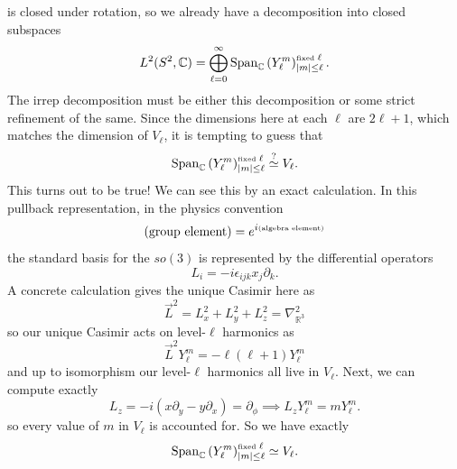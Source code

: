 \documentclass[11pt,letterpaper]{article}
\newcommand{\LP}{\left(}
\newcommand{\RP}{\right)}
\newcommand{\R}{\mathbb{R}}
\newcommand{\C}{\mathbb{C}}
\newcommand{\D}{\partial}
\begin{document}
is closed under rotation, so we already have a decomposition into closed subspaces \begin{equation}
L^2(S^2, \C) = \bigoplus_{\ell = 0}^\infty \mbox{Span}_\C \LP Y_\ell^m \RP_{|m| \leq \ell}^{\mbox{\tiny{fixed }} \ell}.
\end{equation}
The irrep decomposition must be either this decomposition or some strict refinement of the same. Since the dimensions here at each $\ell$ are $2 \ell + 1$, which matches the dimension of $V_\ell$, it is tempting to guess that \begin{equation}
\mbox{Span}_\C \LP Y_\ell^m \RP_{|m| \leq \ell}^{\mbox{\tiny{fixed }} \ell} \stackrel{?}{\simeq} V_\ell.
\end{equation}
This turns out to be true! We can see this by an exact calculation. In this pullback representation, in the physics convention \begin{equation}
\mbox{(group element)} = e^{i \mbox{\tiny{(algebra element)}}}
\end{equation}
the standard basis for the $so(3)$ is represented by the differential operators \begin{equation}
L_i = - i \epsilon_{ijk} x_j \D_k.
\end{equation}
A concrete calculation gives the unique Casimir here as \begin{equation}
\vec{L}^2 = L_x^2 + L_y^2 + L_z^2 = \nabla^2_{\R^3}
\end{equation}
so our unique Casimir acts on level-$\ell$ harmonics as \begin{equation}
\vec{L}^2 Y_\ell^m = - \ell(\ell + 1) Y_\ell^m
\end{equation}
and up to isomorphism our level-$\ell$ harmonics all live in $V_\ell$. Next, we can compute exactly \begin{equation}
L_z = - i (x \D_y - y \D_x) = \D_\phi \implies L_z Y_\ell ^m = m Y_\ell^m.
\end{equation}
so every value of $m$ in $V_\ell$ is accounted for. So we have exactly \begin{equation}
\mbox{Span}_\C \LP Y_\ell^m \RP_{|m| \leq \ell}^{\mbox{\tiny{fixed }} \ell} \simeq V_\ell.
\end{equation} 
\end{document}
